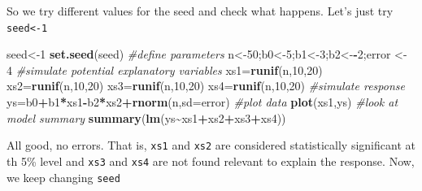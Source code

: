 \documentclass[
]{book}
\newenvironment{Shaded}{\begin{snugshade}}{\end{snugshade}}
\newcommand{\AttributeTok}[1]{\textcolor[rgb]{0.13,0.29,0.53}{#1}}
\newcommand{\CommentTok}[1]{\textcolor[rgb]{0.56,0.35,0.01}{\textit{#1}}}
\newcommand{\DecValTok}[1]{\textcolor[rgb]{0.00,0.00,0.81}{#1}}
\newcommand{\FunctionTok}[1]{\textcolor[rgb]{0.13,0.29,0.53}{\textbf{#1}}}
\newcommand{\NormalTok}[1]{#1}
\newcommand{\OtherTok}[1]{\textcolor[rgb]{0.56,0.35,0.01}{#1}}
\newcommand{\SpecialCharTok}[1]{\textcolor[rgb]{0.81,0.36,0.00}{\textbf{#1}}}
\begin{document}
So we try different values for the seed and check what happens. Let's just try \texttt{seed\textless{}-1}

\begin{Shaded}
\begin{Highlighting}[]
\NormalTok{seed}\OtherTok{\textless{}{-}}\DecValTok{1}
\FunctionTok{set.seed}\NormalTok{(seed)}
\CommentTok{\#define parameters}
\NormalTok{n}\OtherTok{\textless{}{-}}\DecValTok{50}\NormalTok{;b0}\OtherTok{\textless{}{-}}\DecValTok{5}\NormalTok{;b1}\OtherTok{\textless{}{-}}\DecValTok{3}\NormalTok{;b2}\OtherTok{\textless{}{-}}\SpecialCharTok{{-}}\DecValTok{2}\NormalTok{;error }\OtherTok{\textless{}{-}} \DecValTok{4}
\CommentTok{\#simulate potential explanatory variables}
\NormalTok{xs1}\OtherTok{=}\FunctionTok{runif}\NormalTok{(n,}\DecValTok{10}\NormalTok{,}\DecValTok{20}\NormalTok{)}
\NormalTok{xs2}\OtherTok{=}\FunctionTok{runif}\NormalTok{(n,}\DecValTok{10}\NormalTok{,}\DecValTok{20}\NormalTok{)}
\NormalTok{xs3}\OtherTok{=}\FunctionTok{runif}\NormalTok{(n,}\DecValTok{10}\NormalTok{,}\DecValTok{20}\NormalTok{)}
\NormalTok{xs4}\OtherTok{=}\FunctionTok{runif}\NormalTok{(n,}\DecValTok{10}\NormalTok{,}\DecValTok{20}\NormalTok{)}
\CommentTok{\#simulate response}
\NormalTok{ys}\OtherTok{=}\NormalTok{b0}\SpecialCharTok{+}\NormalTok{b1}\SpecialCharTok{*}\NormalTok{xs1}\SpecialCharTok{{-}}\NormalTok{b2}\SpecialCharTok{*}\NormalTok{xs2}\SpecialCharTok{+}\FunctionTok{rnorm}\NormalTok{(n,}\AttributeTok{sd=}\NormalTok{error)}
\CommentTok{\#plot data}
\FunctionTok{plot}\NormalTok{(xs1,ys)}
\CommentTok{\#look at model summary}
\FunctionTok{summary}\NormalTok{(}\FunctionTok{lm}\NormalTok{(ys}\SpecialCharTok{\textasciitilde{}}\NormalTok{xs1}\SpecialCharTok{+}\NormalTok{xs2}\SpecialCharTok{+}\NormalTok{xs3}\SpecialCharTok{+}\NormalTok{xs4))}
\end{Highlighting}
\end{Shaded}

All good, no errors. That is, \texttt{xs1} and \texttt{xs2} are considered statistically significant at th 5\% level and \texttt{xs3} and \texttt{xs4} are not found relevant to explain the response. Now, we keep changing \texttt{seed}
\end{document}
